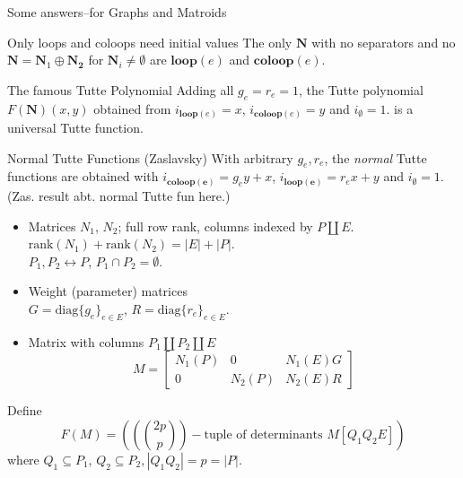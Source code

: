 \documentclass{beamer}
\newcommand{\dunion}{\coprod}
\newcommand{\ext}[1]{\ensuremath{\mathbf{#1}}}
\begin{document}
\begin{frame}{Some answers--for Graphs and Matroids}

  \begin{block}{Only loops and coloops need initial values}
    The only
    $\ext{N}$ with no separators and no $\ext{N}=\ext{N}_1\oplus\ext{N_2}$
    for $\ext{N}_i\neq\emptyset$ are $\mathbf{loop}(e)$
    and $\mathbf{coloop}(e)$.
  \end{block}


  \begin{block}{The famous Tutte Polynomial}
  Adding all $g_e=r_e=1$, the Tutte polynomial $F(\ext{N})(x,y)$
  obtained from $i_{\mathbf{loop}(e)}=x$, 
  $i_{\mathbf{coloop}(e)}=y$ and $i_{\mathbf{\emptyset}}=1$.
  is a universal Tutte function.
  \end{block}
  
  \begin{block}{Normal Tutte Functions}
    (Zaslavsky) With arbitrary $g_e,r_e$, the \emph{normal} Tutte functions are
  obtained with $i_{\mathbf{coloop(e)}}=g_ey + x$,
  $i_{\mathbf{loop(e)}}=r_ex + y$ and  $i_{\mathbf{\emptyset}}=1$.
  (Zas. result abt. normal Tutte fun here.)
  \end{block}

\end{frame}

      
 
    
  

\begin{frame}
  \begin{itemize}
  \item
    Matrices $N_1$, $N_2$; full row rank, columns indexed by
    $P\dunion E$. $\text{rank}(N_1)+\text{rank}(N_2)=|E|+|P|$.\\
    $P_1,P_2\leftrightarrow P$, $P_1\cap P_2=\emptyset$.
  \item
    Weight (parameter) matrices\\
    $G=\text{diag}\{g_e\}_{e\in E} $,
    $R=\text{diag}\{r_e\}_{e\in E} $.
  \item
    Matrix with columns $P_1 \dunion P_2 \dunion E$
    \[
M = \left[\begin{array}{c|c|c} N_1(P)  &  0  &  N_1(E)G \\  \hline
0  & N_2(P)  &  N_2(E)R \end{array}\right]
    \]
  \end{itemize}

  Define
  \[
  F(M)=((\binom{2p}{p})-\text{tuple of determinants\ } M[Q_1Q_2E])
  \]
  where $Q_1\subseteq P_1$, $Q_2\subseteq P_2, |Q_1Q_2|=p=|P|$.
    
\end{frame}
\end{document}
